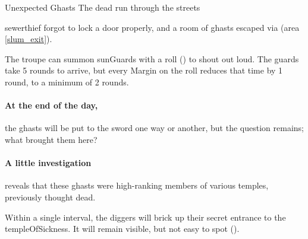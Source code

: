 \warningbard

{Unexpected Ghasts}%
{The dead run through the streets}%

\Gls{sewerthief} forgot to lock a door properly, and a room of ghasts escaped via  (area \vref{slum_exit}).




The troupe can summon \glspl{sunGuard} with a  roll (\tn[7]) to shout out loud.
The guards take 5 rounds to arrive, but every Margin on the roll reduces that time by 1 round, to a minimum of 2 rounds.

\paragraph{At the end of the day,}
the ghasts will be put to the sword one way or another, but the question remains; what brought them here?

\paragraph{A little investigation}
reveals that these ghasts were high-ranking members of various temples, previously thought dead.

Within a single \gls{interval}, the \glspl{digger} will brick up their secret entrance to the \gls{templeOfSickness}.
It will remain visible, but not easy to spot (\tn[10]).
